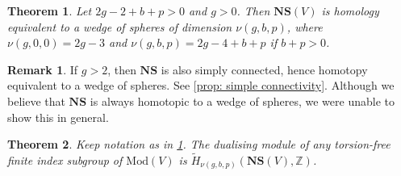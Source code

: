 \documentclass[JEP,XML,SOM,Unicode,NoFloatCountersInSection,published]{cedram}
\theoremstyle{plain}
\newtheorem{thmA}{Theorem}
\theoremstyle{definition}
\newtheorem{rem}[thm]{Remark}
\newcommand{\Z}{\mathbb Z}
\newcommand{\compNS}{\mathbf{NS}}
\newcommand{\hmod}{\mathrm{Mod}}
\begin{document}
\begin{thmA}\label{thm:B}Let $2g -2+ b +p > 0$ and $g>0$. Then $\compNS(V)$ is homology equivalent to a wedge of spheres of dimension $\nu(g,b,p)$, where $\nu(g,0,0) = 2g-3$ and $\nu(g,b,p) = 2g-4+b+p$ if $b+p>0$.
\end{thmA}

\begin{rem}
If $g>2$, then $\compNS$ is also simply connected, hence homotopy equivalent to a wedge of spheres. See \cref{prop: simple connectivity}. Although we believe that $\compNS$ is always homotopic to a wedge of spheres, we were unable to show this in general.
\end{rem}

\begin{thmA}\label{thm:C} Keep notation as in \cref{thm:B}.
The dualising module of any torsion-free finite index subgroup of $\hmod(V)$ is $\widetilde H_{\nu(g,b,p)}(\compNS(V),\Z)$.
\end{thmA}
\end{document}
